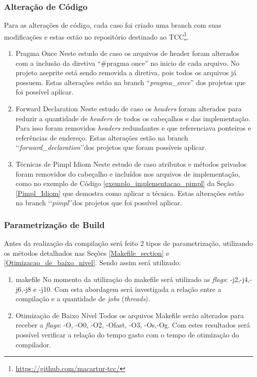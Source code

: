 \subsubsection{Alteração de Código}

 Para as alterações de código, cada caso foi criado
 uma branch com suas modificações e estas estão no repositório
 destinado ao TCC\footnote{\url{https://github.com/macartur-tcc/}}.

    \begin{enumerate}
        \item Pragma Once
        \subitem Neste estudo de caso os arquivos de header foram alterados
 com a inclusão da diretiva “\#pragma once” no inicio de cada arquivo.
 No projeto aseprite está sendo removida a diretiva, pois todos os arquivos já possuem.
Estas alterações estão na branch “\textit{pragma\_once}” dos projetos que foi possível aplicar.
        \item Forward Declaration
        \subitem Neste estudo de caso os \textit{headers} foram alterados para reduzir
 a quantidade de \textit{headers} de todos os cabeçalhos e das implementação.
 Para isso foram removidos \textit{headers} redundantes e que referenciava
 ponteiros e referências de endereço.
Estas alterações estão na branch \lq\lq\textit{forward\_declaration}\rq\rq dos projetos que foram possíveis  aplicar.
        \item Técnicas de Pimpl Idiom
        \subitem Neste estudo de caso atributos e métodos privados foram removidos do cabeçalho
 e incluídos nos arquivos de implementação, como no exemplo de Código \ref{exemplo_implementacao_pimpl} da Seção \ref{Pimpl_Idiom}
 que demostra como aplicar a técnica.
Estas alterações estão na branch \lq\lq\textit{pimpl}\rq\rq dos projetos que foi possível aplicar.
    \end{enumerate}

\subsubsection{Parametrização de Build}

	Antes da realização da compilação será feito 2 tipos de parametrização,
 utilizando os métodos detalhados nas Seções \ref{Makefile_section} e 
\ref{Otimizacao_de_baixo_nivel}. Sendo assim será utilizado: 

        \begin{enumerate}
            \item makefile
                \subitem No momento da utilização do makefile será utilizado
 as \textit{flags}: -j2,-j4,-j6,-j8 e -j10.
 Com esta abordagem será investigada a relação entre a compilação
 e a quantidade de \textit{jobs} (\textit{threads}).
            \item Otimização de Baixo Nível
                \subitem Todos os arquivos Makefile serão
 alterados para receber a \textit{flags}: -O, -O0, -O2, -Ofast, -O3, -Os,-Og.
 Com estes resultados será possível verificar a relação do tempo gasto com
 o tempo de otimização do compilador.
        \end{enumerate}


